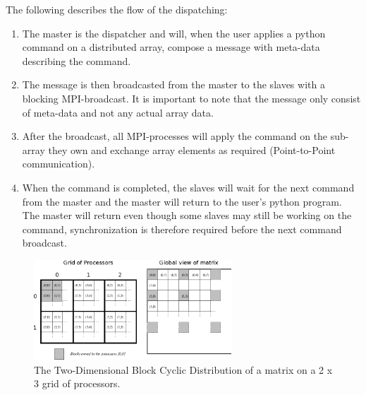 \documentclass[10pt]{article}
\begin{document}
The following describes the flow of the dispatching:
\begin{enumerate}
\item The master is the dispatcher and will, when the user applies a python command on a distributed array, compose a message with meta-data describing the command. 
\item The message is then broadcasted from the master to the slaves with a blocking MPI-broadcast. It is important to note that the message only consist of meta-data and not any actual array data.
\item After the broadcast, all MPI-processes will apply the command on the sub-array they own and exchange array elements as required (Point-to-Point communication).
\item When the command is completed, the slaves will wait for the next command from the master and the master will return to the user's python program. The master will return even though some slaves may still be working on the command, synchronization is therefore required before the next command broadcast.
\end{enumerate}


\begin{figure}
 \centering
 \includegraphics[width=280px]{gfx/datalayout}
 \caption{The Two-Dimensional Block Cyclic Distribution of a matrix on a 2 x 3 grid of processors.}
 \label{fig:datalayout}
\end{figure}
\end{document}
